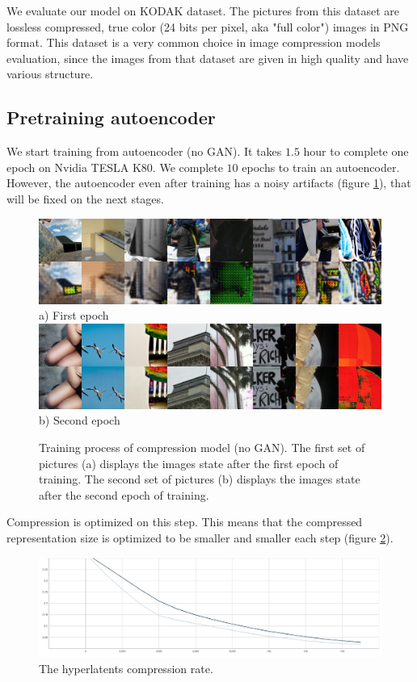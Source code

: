 We evaluate our model on KODAK \cite{kodak} dataset. The pictures from this dataset are lossless compressed, true color (24 bits per pixel, aka "full color") images in PNG format. This dataset is a very common choice in image compression models evaluation, since the images from that dataset are given in high quality and have various structure.

\subsection{Pretraining autoencoder}

We start training from autoencoder (no GAN). It takes $1.5$ hour to complete one epoch on Nvidia TESLA K80. We complete $10$ epochs to train an autoencoder. However, the autoencoder even after training has a noisy artifacts (figure \ref{training-compression-examples}), that will be fixed on the next stages.

\begin{figure}[!ht]
    \centering
    \includegraphics[width=\textwidth]{figure/step_1000.png}
    a) First epoch
    \includegraphics[width=\textwidth]{figure/step_15000.png}
    b) Second epoch
    \caption{Training process of compression model (no GAN). The first set of pictures (a) displays the images state after the first epoch of training. The second set of pictures (b) displays the images state after the second epoch of training.}
    \label{training-compression-examples}
\end{figure}

Compression is optimized on this step. This means that the compressed representation size is optimized to be smaller and smaller each step (figure \ref{training-compression-q-rate}).

\begin{figure}[!ht]
    \centering
    \includegraphics[width=\textwidth]{figure/compression-q-rate-hyperlatent.png}
    \caption{The hyperlatents compression rate.}
    \label{training-compression-q-rate}
\end{figure}

